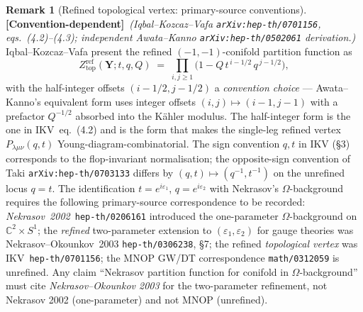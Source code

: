 \documentclass[11pt]{amsart}
\theoremstyle{definition}
\newtheorem{remark}[theorem]{Remark}
\providecommand{\bY}{\mathbf{Y}}
\providecommand{\bC}{\mathbb{C}}
\providecommand{\ClaimStatusConventionDependent}{\textbf{\textsf{[Convention-dependent]}}}
\begin{document}
\begin{remark}[Refined topological vertex: primary-source conventions]
\label{rem:ikv-refined-conventions}
\ClaimStatusConventionDependent\ \emph{(Iqbal--Kozcaz--Vafa
\texttt{arXiv:hep-th/0701156}, eqs.~(4.2)--(4.3); independent
Awata--Kanno \texttt{arXiv:hep-th/0502061} derivation.)}
Iqbal--Kozcaz--Vafa present the refined $(-1,-1)$-conifold partition
function as
\[
  Z^{\mathrm{ref}}_{\mathrm{top}}(\bY; t, q, Q)
  \;=\; \prod_{i, j \geq 1}
    \bigl(1 - Q\, t^{\,i - 1/2}\, q^{\,j - 1/2}\bigr),
\]
with the half-integer offsets $(i-1/2, j-1/2)$ a \emph{convention
choice} — Awata--Kanno's equivalent form uses integer offsets
$(i, j)\mapsto(i-1,j-1)$ with a prefactor $Q^{-1/2}$ absorbed into the
Kähler modulus. The half-integer form is the one in IKV~eq.~(4.2) and
is the form that makes the single-leg refined vertex
$P_{\lambda\mu\nu}(q,t)$ Young-diagram-combinatorial. The sign
convention $q,t$ in IKV (\S3) corresponds to the flop-invariant
normalisation; the opposite-sign convention of Taki
\texttt{arXiv:hep-th/0703133} differs by $(q,t) \mapsto (q^{-1}, t^{-1})$
on the unrefined locus $q = t$. The identification $t = e^{i\varepsilon_1}$,
$q = e^{i\varepsilon_2}$ with Nekrasov's $\Omega$-background requires the
following primary-source correspondence to be recorded:
\emph{Nekrasov~2002}~\texttt{hep-th/0206161} introduced the
one-parameter $\Omega$-background on $\bC^2 \times S^1$; the
\emph{refined} two-parameter extension to $(\varepsilon_1,\varepsilon_2)$
for gauge theories was Nekrasov--Okounkov~2003
\texttt{hep-th/0306238}, §7; the refined \emph{topological vertex} was
IKV~\texttt{hep-th/0701156}; the MNOP GW/DT correspondence
\texttt{math/0312059} is unrefined. Any claim ``Nekrasov partition
function for conifold in $\Omega$-background'' must cite
\emph{Nekrasov--Okounkov 2003} for the two-parameter refinement, not
Nekrasov 2002 (one-parameter) and not MNOP (unrefined).
\end{remark}
\end{document}
